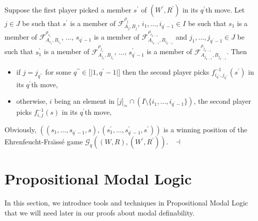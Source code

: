\documentclass[draft]{article}
\newenvironment{proof}{{\bf Proof:}}{~$\dashv$\\}
\def\lsem{{\lbrack\mid}}
\def\rsem{{\mid\rbrack}}
\begin{document}
\begin{proof}
\begin{itemize}
%
%
\end{itemize}
%
%
Suppose the first player picked a member $s^{\prime}$ of $(W^{\prime},R^{\prime})$ in its $q^{\prime}$th move.
Let $j{\in}J$ be such that $s^{\prime}$ is a member of ${\mathcal F}_{A_{j},B_{j}}^{\rho_{j}}$, $i_{1},\ldots,i_{q^{\prime}{-}1}{\in}I$ be such that $s_{1}$ is a member of ${\mathcal F}_{A_{i_{1}},B_{i_{1}}}^{\rho_{i_{1}}}$, $\ldots$, $s_{q^{\prime}{-}1}$ is a member of ${\mathcal F}_{A_{i_{q^{\prime}{-}1}},B_{i_{q^{\prime}{-}1}}}^{\rho_{i_{q^{\prime}{-}1}}}$ and $j_{1},\ldots,j_{q^{\prime}{-}1}{\in}J$ be such that $s^{\prime}_{1}$ is a member of ${\mathcal F}_{A_{j_{1}},B_{j_{1}}}^{\rho_{j_{1}}}$, $\ldots$, $s^{\prime}_{q^{\prime}{-}1}$ is a member of ${\mathcal F}_{A_{j_{q^{\prime}{-}1}},B_{j_{q^{\prime}{-}1}}}^{\rho_{j_{q^{\prime}{-}1}}}$.
Then
%
%
\begin{itemize}
%
%
\item if $j{=}j_{q^{\prime\prime}}$ for some $q^{\prime\prime}{\in}\lsem1,q^{\prime}{-}1\rsem$ then the second player picks $f^{{-}1}_{i_{q^{\prime\prime}},j_{q^{\prime\prime}}}(s^{\prime})$ in its $q^{\prime}$th move,
%
%
\item otherwise, $i$ being an element in $\lbrack j\rbrack_{\simeq}{\cap}(I{\setminus}\{i_{1},\ldots,i_{q^{\prime}{-}1}\})$, the second play\-er picks $f^{{-}1}_{i,j}(s)$ in its $q^{\prime}$th move,
%
%
\end{itemize}
%
%
Obviously, $((s_{1},\ldots,s_{q^{\prime}{-}1},s),(s^{\prime}_{1},\ldots,s^{\prime}_{q^{\prime}{-}1},s^{\prime}))$ is a winning position of the Eh\-renfeucht-Fra\"\i ss\'e game ${\mathcal G}_{q}((W,R),(W^{\prime},R^{\prime}))$.
%
%
\medskip
%
%
\end{proof}
%
%
%
%
\section{Propositional Modal Logic}
%
%
In this section, we introduce tools and techniques in Propositional Modal Logic that we will need later in our proofs about modal definability.
%
%
%
%
\end{document}

